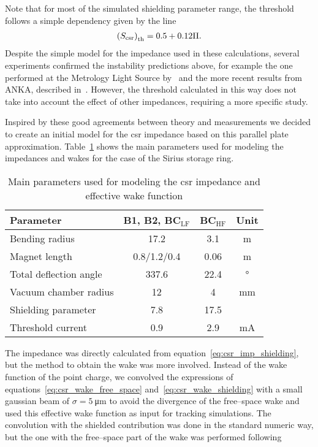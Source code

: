     Note that for most of the simulated shielding parameter range, the threshold follows a simple dependency given by the line
    \begin{align}\label{eq:csr_scaling_instability}
        \left(S_\text{csr}\right)_\text{th} = 0.5 + 0.12\Pi.
    \end{align}
    Despite the simple model for the impedance used in these calculations, several experiments confirmed the instability predictions above, for example the one performed at the Metrology Light Source by~ and the more recent results from ANKA, described in~. However, the threshold calculated in this way does not take into account the effect of other impedances, requiring a more specific study.

    Inspired by these good agreements between theory and measurements we decided to create an initial model for the \gls{csr} impedance based on this parallel plate approximation. Table~\ref{tab:csr_main_parameters} shows the main parameters used for modeling the impedances and wakes for the case of the Sirius storage ring.
    \begin{table}
        \centering
        \caption{Main parameters used for modeling the \gls{csr} impedance and effective wake function}
        \label{tab:csr_main_parameters}
        \begin{tabular}{lccc}
            \toprule
            Parameter              & B1, B2, BC$_\text{LF}$ & BC$_\text{HF}$ & Unit \\
            \midrule
            Bending radius         & 17.2             &  3.1  &\si{\meter}\\
            Magnet length          & 0.8/1.2/0.4      &  0.06 &\si{\meter}\\
            Total deflection angle & 337.6            &  22.4 &\si{\degree}\\
            Vacuum chamber radius  & 12               &  4    &\si{\milli\meter}\\
            Shielding parameter    & 7.8              &  17.5 & \\
            Threshold current      & 0.9              &  2.9  & \si{\milli\ampere}\\
            \bottomrule
        \end{tabular}
    \end{table}
    The impedance was directly calculated from equation~\eqref{eq:csr_imp_shielding}, but the method to obtain the wake was more involved. Instead of the wake function of the point charge, we convolved the expressions of equations~\eqref{eq:csr_wake_free_space} and~\eqref{eq:csr_wake_shielding} with a small gaussian beam of $\sigma = 5~$\si{\micro\meter} to avoid the divergence of the free--space wake and used this effective wake function as input for tracking simulations. The convolution with the shielded contribution was done in the standard numeric way, but the one with the free--space part of the wake was performed following~
